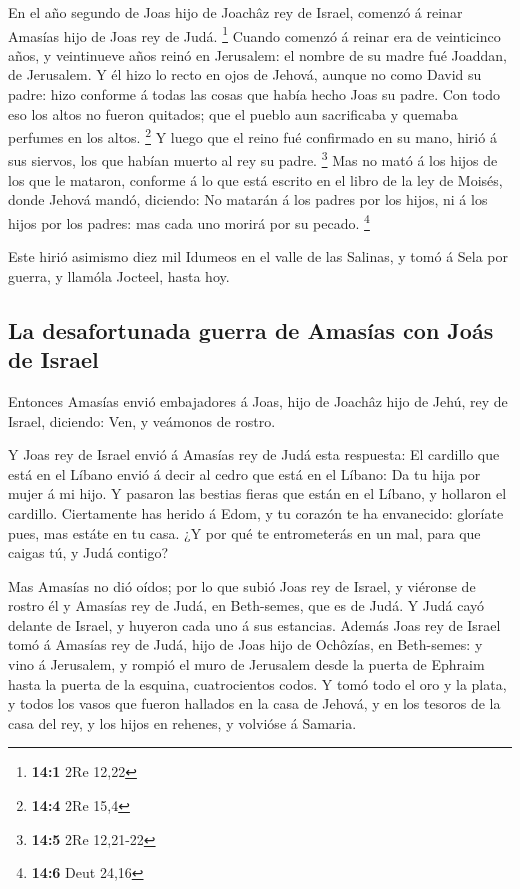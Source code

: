  En el año segundo de Joas hijo de Joachâz rey de Israel,
comenzó á reinar Amasías hijo de Joas rey de Judá. \footnote{\textbf{14:1}
  2Re 12,22}  Cuando comenzó á reinar era de veinticinco
años, y veintinueve años reinó en Jerusalem: el nombre de su madre fué
Joaddan, de Jerusalem.  Y él hizo lo recto en ojos de
Jehová, aunque no como David su padre: hizo conforme á todas las cosas
que había hecho Joas su padre.  Con todo eso los altos no
fueron quitados; que el pueblo aun sacrificaba y quemaba perfumes en los
altos. \footnote{\textbf{14:4} 2Re 15,4}  Y luego que el
reino fué confirmado en su mano, hirió á sus siervos, los que habían
muerto al rey su padre. \footnote{\textbf{14:5} 2Re 12,21-22}
 Mas no mató á los hijos de los que le mataron, conforme á
lo que está escrito en el libro de la ley de Moisés, donde Jehová mandó,
diciendo: No matarán á los padres por los hijos, ni á los hijos por los
padres: mas cada uno morirá por su pecado. \footnote{\textbf{14:6} Deut
  24,16}

 Este hirió asimismo diez mil Idumeos en el valle de las
Salinas, y tomó á Sela por guerra, y llamóla Jocteel, hasta hoy.

\hypertarget{la-desafortunada-guerra-de-amasuxedas-con-jouxe1s-de-israel}{%
\subsection{La desafortunada guerra de Amasías con Joás de
Israel}\label{la-desafortunada-guerra-de-amasuxedas-con-jouxe1s-de-israel}}

 Entonces Amasías envió embajadores á Joas, hijo de
Joachâz hijo de Jehú, rey de Israel, diciendo: Ven, y veámonos de
rostro.

 Y Joas rey de Israel envió á Amasías rey de Judá esta
respuesta: El cardillo que está en el Líbano envió á decir al cedro que
está en el Líbano: Da tu hija por mujer á mi hijo. Y pasaron las bestias
fieras que están en el Líbano, y hollaron el cardillo. 
Ciertamente has herido á Edom, y tu corazón te ha envanecido: gloríate
pues, mas estáte en tu casa. ¿Y por qué te entrometerás en un mal, para
que caigas tú, y Judá contigo?

 Mas Amasías no dió oídos; por lo que subió Joas rey de
Israel, y viéronse de rostro él y Amasías rey de Judá, en Beth-semes,
que es de Judá.  Y Judá cayó delante de Israel, y huyeron
cada uno á sus estancias.  Además Joas rey de Israel tomó
á Amasías rey de Judá, hijo de Joas hijo de Ochôzías, en Beth-semes: y
vino á Jerusalem, y rompió el muro de Jerusalem desde la puerta de
Ephraim hasta la puerta de la esquina, cuatrocientos codos.
 Y tomó todo el oro y la plata, y todos los vasos que
fueron hallados en la casa de Jehová, y en los tesoros de la casa del
rey, y los hijos en rehenes, y volvióse á Samaria.

